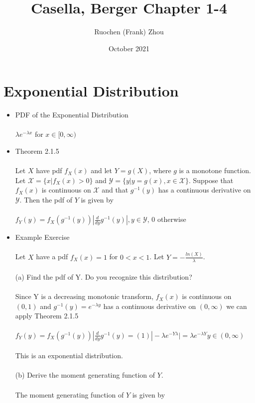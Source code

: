 \documentclass{article}
\title{Casella, Berger Chapter 1-4}
\author{Ruochen (Frank) Zhou }
\date{October 2021}
\begin{document}
\maketitle

\section{Exponential Distribution}
\begin{itemize}
    \item PDF of the Exponential Distribution\\\\
    $\lambda e^{-\lambda x}$ for $x\in[0,\infty)$\\
    \item Theorem 2.1.5\\\\
    Let $X$ have pdf $f_X(x)$ and let $Y=g(X)$, where $g$ is a monotone function. Let $\mathcal{X}=\{x|f_X(x)>0\}$ and $\mathcal{Y}=\{y|y=g(x),x\in\mathcal{X}\}$.  Suppose that $f_X(x)$ is continuous on $\mathcal{X}$ and that $g^{-1}(y)$ has a continuous derivative on $\mathcal{Y}$.  Then the pdf of $Y$ is given by\\\\
    $f_Y(y)=f_X(g^{-1}(y))|\frac{d}{dy}g^{-1}(y)|, y\in\mathcal{Y}$, 0 otherwise\\
    \item Example Exercise\\\\
    Let $X$ have a pdf $f_X(x)=1$ for $0<x<1$.  Let $Y=-\frac{ln(X)}{\lambda}$.\\\\
    (a) Find the pdf of Y.  Do you recognize this distribution?\\\\
    Since Y is a decreasing monotonic transform, $f_X(x)$ is continuous on $(0,1)$ and $g^{-1}(y)=e^{-\lambda y}$ has a continuous derivative on $(0,\infty)$ we can apply Theorem 2.1.5\\\\
    $f_Y(y) = f_X(g^{-1}(y))|\frac{d}{dy}g^{-1}(y)=(1)|-\lambda e^{-Y\lambda}|=\lambda e^{-\lambda Y} y\in(0,\infty)$\\\\
    This is an exponential distribution.\\\\
    (b) Derive the moment generating function of $Y$.\\\\
    The moment generating function of $Y$ is given by\\\\

\end{itemize}
\end{document}
